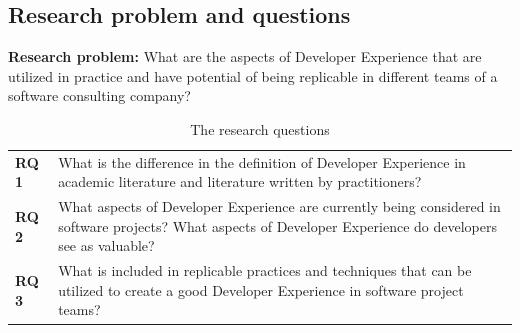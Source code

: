 \documentclass[english, 12pt, a4paper, sci, utf8, a-1b, online]{aaltothesis}
\begin{document}

\subsection{Research problem and questions}

\newcommand{\researchproblem}{What are the aspects of Developer Experience that are utilized in practice and have potential of being replicable in different teams of a software consulting company?}

\textbf{Research problem:} \researchproblem

\newcommand{\rqone}{What is the difference in the definition of Developer Experience in academic literature and literature written by practitioners?}
\newcommand{\rqtwo}{What aspects of Developer Experience are currently being considered in software projects? What aspects of Developer Experience do developers see as valuable?}
\newcommand{\rqthree}{What is included in replicable practices and techniques that can be utilized to create a good Developer Experience in software project teams?}

\begin{table}[htb]
  \begin{center}
    \begin{tabularx}{\textwidth}{lX}
      \textbf{RQ 1} & \rqone \label{RQ1}   \\
      \textbf{RQ 2} & \rqtwo \label{RQ2}   \\
      \textbf{RQ 3} & \rqthree \label{RQ3}
    \end{tabularx}
  \end{center}
  \caption{The research questions \label{researchquestions}}
\end{table}
\end{document}
